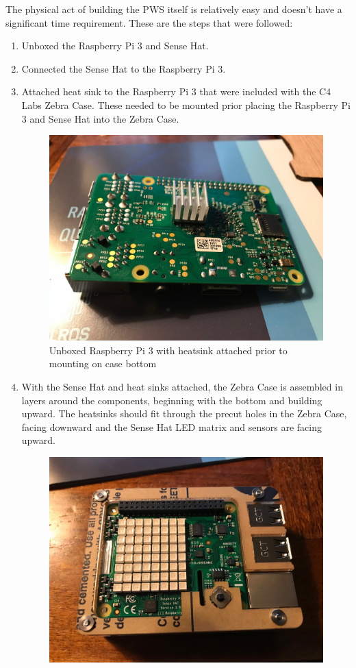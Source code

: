 \documentclass[sigconf]{acmart}
\begin{document}
The physical act of building the PWS itself is relatively easy and doesn't have a significant time requirement. These are the steps that were followed:
\begin{enumerate}
\item Unboxed the Raspberry Pi 3 and Sense Hat.
\item Connected the Sense Hat to the Raspberry Pi 3.
\item Attached heat sink to the Raspberry Pi 3 that were included with the C4 Labs Zebra Case. These needed to be mounted prior placing the Raspberry Pi 3 and Sense Hat into the Zebra Case.
\begin{figure}[H]
    \centering
    \includegraphics[width=\columnwidth]{images/RASP3_1.jpg}
    \caption{Unboxed Raspberry Pi 3 with heatsink attached prior to mounting on case bottom}
\end{figure}
\item With the Sense Hat and heat sinks attached, the Zebra Case is assembled in layers around the components, beginning with the bottom and building upward. The heatsinks should fit through the precut holes in the Zebra Case, facing downward and the Sense Hat LED matrix and sensors are facing upward.
\begin{figure}[H]
    \centering
    \includegraphics[width=\columnwidth]{images/SENSE_Case1.jpg}

\end{figure}
\end{enumerate}
\end{document}
